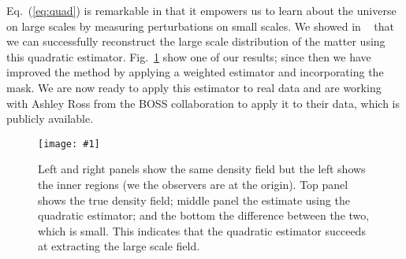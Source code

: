 \documentclass[12pt]{article}
\newcommand{\sfig}[2]{
\begin{center}
\texttt{[image: \#1]}
\end{center}
        }
\newcommand{\Sfig}[2]{
    \begin{figure}[!h]
    \sfig{./#1.pdf}{.7\columnwidth}
    \caption{{\small #2}}
    \label{fig:#1}
    \end{figure}
}
\newcommand{\rf}[1]{\ref{fig:#1}}
\newcommand{\ec}[1]{Eq.~(\ref{eq:#1})}
\begin{document}
\begin{small}
\ec{quad} is remarkable in that it empowers us to learn about the universe on large scales by measuring perturbations on small scales. We showed in ~\cite{Li:2020uug,Li:2020luq} that we can successfully reconstruct the large scale distribution of the matter using this quadratic estimator. Fig.~\rf{cube_dm} show one of our results; since then we have improved the method by applying a weighted estimator and incorporating the mask. We are now ready to apply this estimator to real data and are working with Ashley Ross from the BOSS collaboration to apply it to their data, which is publicly available. 


\Sfig{cube_dm}{Left and right panels show the same density field but the left shows the inner regions (we the observers are at the origin). Top panel shows the true density field; middle panel the estimate using the quadratic estimator; and the bottom the difference between the two, which is small. This indicates that the quadratic estimator succeeds at extracting the large scale field.}



\end{small}
\end{document}
